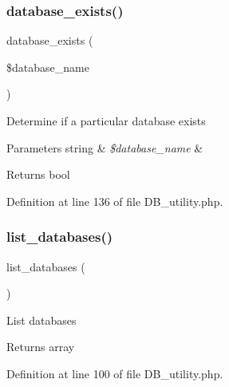 \mbox{\label{class_c_i___d_b__utility_ac0ba63aa14b19a37d4773fcc252bde81}} 
\subsubsection{\texorpdfstring{database\_exists()}{database\_exists()}}
{\footnotesize\ttfamily database\+\_\+exists (\begin{DoxyParamCaption}\item[{}]{\$database\+\_\+name }\end{DoxyParamCaption})}

Determine if a particular database exists


\begin{DoxyParams}[1]{Parameters}
string & {\em \$database\+\_\+name} & \\
\hline
\end{DoxyParams}
\begin{DoxyReturn}{Returns}
bool 
\end{DoxyReturn}


Definition at line 136 of file D\+B\+\_\+utility.\+php.

\mbox{\label{class_c_i___d_b__utility_a8486b247a8868504b055622cb2dd34d3}} 
\subsubsection{\texorpdfstring{list\_databases()}{list\_databases()}}
{\footnotesize\ttfamily list\+\_\+databases (\begin{DoxyParamCaption}{ }\end{DoxyParamCaption})}

List databases

\begin{DoxyReturn}{Returns}
array 
\end{DoxyReturn}


Definition at line 100 of file D\+B\+\_\+utility.\+php.

\mbox{\label{class_c_i___d_b__utility_acb26598e177f525b39978f6dfca1f212}} 
